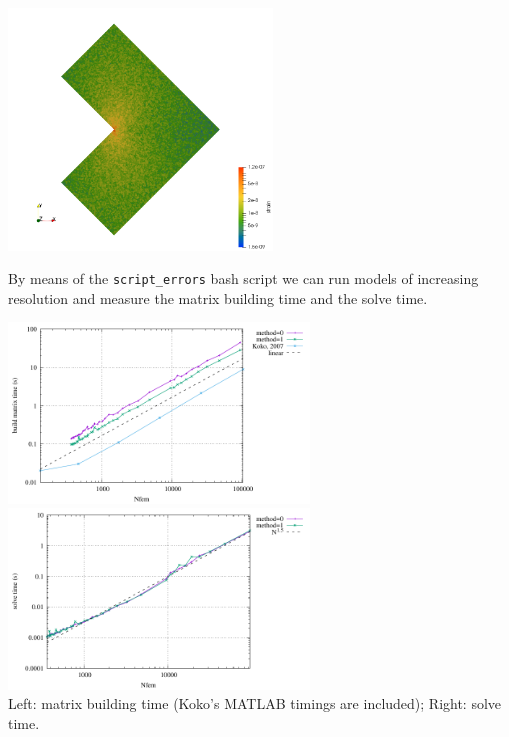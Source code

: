 \begin{center}
\includegraphics[width=7cm]{python_codes/fieldstone_179/RESULTS/strain}
\end{center}

By means of the {\tt script\_errors} bash script we can run models 
of increasing resolution and measure the matrix building time and the 
solve time.
\begin{center}
\includegraphics[width=8cm]{python_codes/fieldstone_179/RESULTS/build.pdf}
\includegraphics[width=8cm]{python_codes/fieldstone_179/RESULTS/solve.pdf}\\
{\captionfont Left: matrix building time (Koko's MATLAB timings are included);
Right: solve time.}
\end{center}

